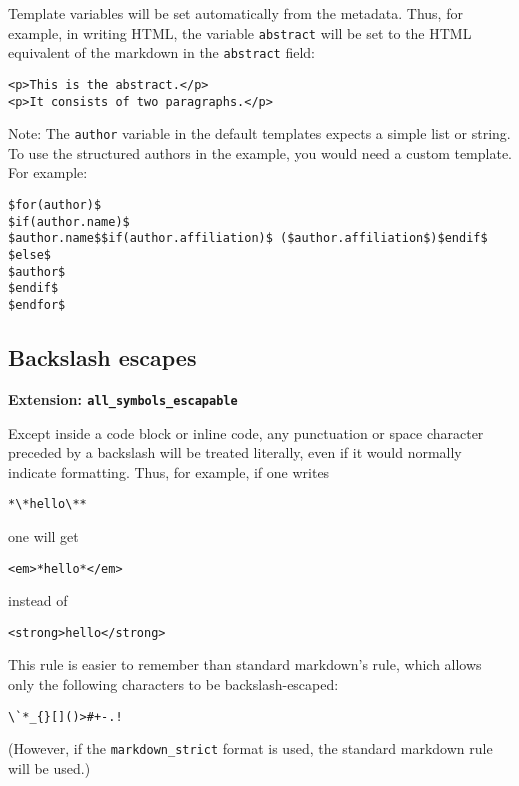 \documentclass[]{article}
\begin{document}
Template variables will be set automatically from the metadata. Thus,
for example, in writing HTML, the variable \texttt{abstract} will be set
to the HTML equivalent of the markdown in the \texttt{abstract} field:

\begin{verbatim}
<p>This is the abstract.</p>
<p>It consists of two paragraphs.</p>
\end{verbatim}

Note: The \texttt{author} variable in the default templates expects a
simple list or string. To use the structured authors in the example, you
would need a custom template. For example:

\begin{verbatim}
$for(author)$
$if(author.name)$
$author.name$$if(author.affiliation)$ ($author.affiliation$)$endif$
$else$
$author$
$endif$
$endfor$
\end{verbatim}

\subsection{Backslash escapes}\label{backslash-escapes}

\textbf{Extension: \texttt{all\_symbols\_escapable}}

Except inside a code block or inline code, any punctuation or space
character preceded by a backslash will be treated literally, even if it
would normally indicate formatting. Thus, for example, if one writes

\begin{verbatim}
*\*hello\**
\end{verbatim}

one will get

\begin{verbatim}
<em>*hello*</em>
\end{verbatim}

instead of

\begin{verbatim}
<strong>hello</strong>
\end{verbatim}

This rule is easier to remember than standard markdown's rule, which
allows only the following characters to be backslash-escaped:

\begin{verbatim}
\`*_{}[]()>#+-.!
\end{verbatim}

(However, if the \texttt{markdown\_strict} format is used, the standard
markdown rule will be used.)
\end{document}
